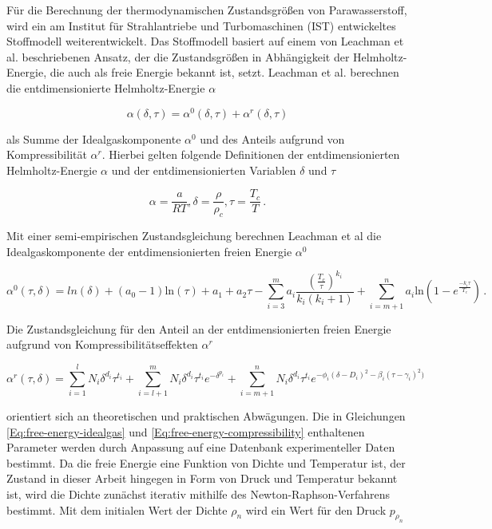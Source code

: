 Für die Berechnung der thermodynamischen Zustandsgrößen von Parawasserstoff, wird ein am Institut für Strahlantriebe und Turbomaschinen (IST) entwickeltes Stoffmodell weiterentwickelt. Das Stoffmodell basiert auf einem von Leachman et al. \cite{Leachman.2017} beschriebenen Ansatz, der die Zustandsgrößen in Abhängigkeit der Helmholtz-Energie, die auch als freie Energie bekannt ist, setzt. Leachman et al. berechnen die entdimensionierte Helmholtz-Energie $\alpha$ 

\begin{equation}\label{Eq:free-energy}
    \alpha(\delta, \tau) = \alpha^0(\delta, \tau) + \alpha^r(\delta, \tau)
\end{equation}

als Summe der Idealgaskomponente $\alpha^0$ und des Anteils aufgrund von Kompressibilität $\alpha^r$. Hierbei gelten folgende Definitionen der entdimensionierten Helmholtz-Energie $\alpha$ und der entdimensionierten Variablen $\delta$ und $\tau$

\begin{equation}
    \alpha = \frac{a}{RT}, \delta = \frac{\rho}{\rho_c}, \tau = \frac{T_c}{T} \,.
\end{equation}

Mit einer semi-empirischen Zustandsgleichung berechnen Leachman et al die Idealgaskomponente der entdimensionierten freien Energie $\alpha^0$

\begin{equation}\label{Eq:free-energy-idealgas}
    \alpha^0(\tau,\delta)=ln(\delta)+(a_0-1)\mathrm{ln}(\tau)+a_1+a_2\tau-\sum_{i=3}^{m}a_i\frac{(\frac{T_c}{\tau})^{k_i}}{k_i(k_i+1)}+\sum_{i=m+1}^{n}a_i\mathrm{ln}\left(1-e^{\frac{-k_i\tau}{T_c}}\right) \,.
\end{equation}

Die Zustandsgleichung für den Anteil an der entdimensionierten freien Energie aufgrund von Kompressibilitätseffekten $\alpha^r$

\begin{equation}\label{Eq:free-energy-compressibility}
    \alpha^r(\tau,\delta)=\sum_{i=1}^{l}N_i\delta^{d_i}\tau^{t_i}+\sum_{i=l+1}^{m}N_i\delta^{d_i}\tau^{t_i}e^{-\delta^{p_i}}+\sum_{i=m+1}^{n}N_i\delta^{d_i}\tau^{t_i}e^{-\phi_i(\delta-D_i)^2-\beta_i(\tau-\gamma_i)^2)}
\end{equation}

orientiert sich an theoretischen und praktischen Abwägungen. Die in Gleichungen \ref{Eq:free-energy-idealgas} und \ref{Eq:free-energy-compressibility} enthaltenen Parameter werden durch Anpassung auf eine Datenbank experimenteller Daten bestimmt. Da die freie Energie eine Funktion von Dichte und Temperatur ist, der Zustand in dieser Arbeit hingegen in Form von Druck und Temperatur bekannt ist, wird die Dichte zunächst iterativ mithilfe des Newton-Raphson-Verfahrens bestimmt. Mit dem initialen Wert der Dichte $\rho_n$ wird ein Wert für den Druck $p_{\rho_n}$ 

